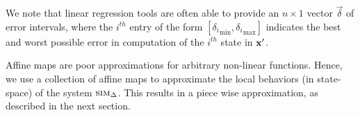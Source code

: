 
We note that linear regression tools are often able to provide an
$n\times 1$ vector $\vec{\delta}$ of error intervals, where the
$i^{th}$ entry of the form $[{\delta_i}_{\min},{\delta_i}_{\max}]$
indicates the best and worst possible error in computation of the
$i^{th}$ state in $\mathbf{x}'$.


Affine maps are poor approximations for arbitrary non-linear
functions. Hence, we use a collection of affine maps to approximate
the local behaviors (in state-space) of the system $\mbox{\sc sim}_\Delta$. This
results in a piece wise approximation, as described in the next
section.





